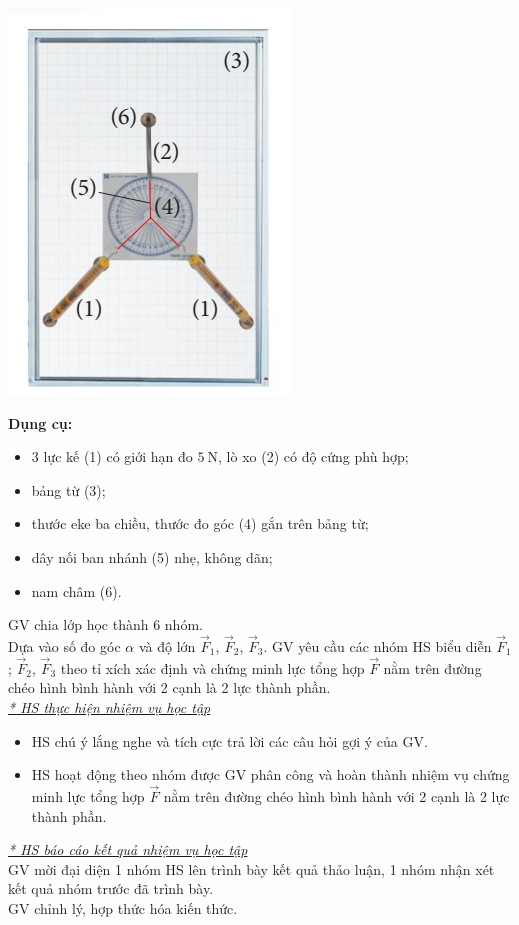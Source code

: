 {\begin{itemize}[label=-]
		\begin{center}
			\includegraphics[scale=1]{figs/G10-BAI9-5}
		\end{center}
		\textbf{Dụng cụ:}
		\begin{itemize}[label=$\bullet$]
			\item 3 lực kế (1) có giới hạn đo $\SI{5}{\newton}$, lò xo (2) có độ cứng phù hợp;
			\item bảng từ (3);
			\item thước eke ba chiều, thước đo góc (4) gắn trên bảng từ;
			\item dây nối ban nhánh (5) nhẹ, không dãn;
			\item nam châm (6).
		\end{itemize}
	\end{itemize}
	GV chia lớp học thành 6 nhóm.\\
	Dựa vào số đo góc $\alpha$ và độ lớn $\vec{F}_1$, $\vec{F}_2$, $\vec{F}_3$. GV yêu cầu các nhóm HS biểu diễn $\vec{F}_1$; $\vec{F}_2$, $\vec{F}_3$ theo tỉ xích xác định và chứng minh lực tổng hợp $\vec{F}$ nằm trên đường chéo hình bình hành với 2 cạnh là 2 lực thành phần.\\
	\textit{\underline{* HS thực hiện nhiệm vụ học tập}}
	\begin{itemize}[label=-]
		\item HS chú ý lắng nghe và tích cực trả lời các câu hỏi gợi ý của GV.
		\item HS hoạt động theo nhóm được GV phân công và hoàn thành nhiệm vụ chứng minh lực tổng hợp $\vec{F}$ nằm trên đường chéo hình bình hành với 2 cạnh là 2 lực thành phần.
	\end{itemize}
	\textit{\underline{* HS báo cáo kết quả nhiệm vụ học tập}}\\
	GV mời đại diện 1 nhóm HS lên trình bày kết quả thảo luận, 1 nhóm nhận xét kết quả nhóm trước đã trình bày.\\
	GV chỉnh lý, hợp thức hóa kiến thức.
}
